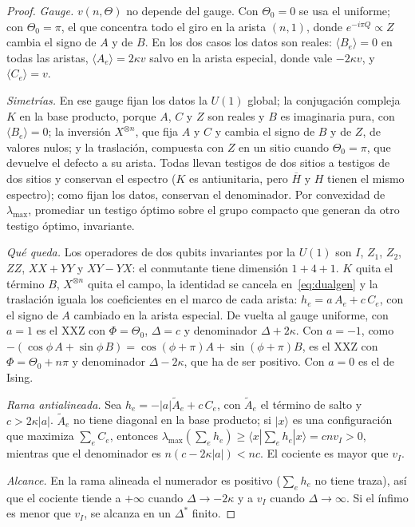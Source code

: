\documentclass[11pt,a4paper]{article}
\theoremstyle{remark}
\newcommand{\ket}[1]{|#1\rangle}
\newcommand{\bra}[1]{\langle #1|}
\newcommand{\ev}[1]{\langle #1\rangle}
\begin{document}
\begin{proof}
\emph{Gauge.} $v(n,\Theta)$ no depende del gauge. Con $\Theta_0=0$ se usa el uniforme; con
$\Theta_0=\pi$, el que concentra todo el giro en la arista $(n,1)$, donde $e^{-i\pi Q}\propto Z$
cambia el signo de $A$ y de $B$. En los dos casos los datos son reales: $\ev{B_e}=0$ en todas las
aristas, $\ev{A_e}=2\kappa v$ salvo en la arista especial, donde vale $-2\kappa v$, y
$\ev{C_e}=v$.

\emph{Simetrías.} En ese gauge fijan los datos la $U(1)$ global; la conjugación compleja $K$ en la
base producto, porque $A$, $C$ y $Z$ son reales y $B$ es imaginaria pura, con $\ev{B_e}=0$; la
inversión $X^{\otimes n}$, que fija $A$ y $C$ y cambia el signo de $B$ y de $Z$, de valores nulos;
y la traslación, compuesta con $Z$ en un sitio cuando $\Theta_0=\pi$, que devuelve el defecto a su
arista. Todas llevan testigos de dos sitios a testigos de dos sitios y conservan el espectro ($K$ es
antiunitaria, pero $\overline H$ y $H$ tienen el mismo espectro); como fijan los datos, conservan
el denominador. Por convexidad de $\lambda_{\max}$, promediar un testigo óptimo sobre el grupo
compacto que generan da otro testigo óptimo, invariante.

\emph{Qué queda.} Los operadores de dos qubits invariantes por la $U(1)$ son $I$, $Z_1$, $Z_2$,
$ZZ$, $XX+YY$ y $XY-YX$: el conmutante tiene dimensión $1+4+1$. $K$ quita el término $B$,
$X^{\otimes n}$ quita el campo, la identidad se cancela en~\eqref{eq:dualgen} y la traslación iguala
los coeficientes en el marco de cada arista: $h_e=a\,A_e+c\,C_e$, con el signo de $A$ cambiado en
la arista especial. De vuelta al gauge uniforme, con $a=1$ es el XXZ con $\Phi=\Theta_0$, $\Delta=c$
y denominador $\Delta+2\kappa$. Con $a=-1$, como $-(\cos\phi\,A+\sin\phi\,B)=\cos(\phi+\pi)A+
\sin(\phi+\pi)B$, es el XXZ con $\Phi=\Theta_0+n\pi$ y denominador $\Delta-2\kappa$, que ha de ser
positivo. Con $a=0$ es el de Ising.

\emph{Rama antialineada.} Sea $h_e=-|a|\tilde A_e+c\,C_e$, con $\tilde A_e$ el término de salto y
$c>2\kappa|a|$. $\tilde A_e$ no tiene diagonal en la base producto; si $\ket x$ es una configuración
que maximiza $\sum_eC_e$, entonces $\lambda_{\max}(\sum_eh_e)\ge\bra x\sum_eh_e\ket x=cnv_I>0$,
mientras que el denominador es $n(c-2\kappa|a|)<nc$. El cociente es mayor que $v_I$.

\emph{Alcance.} En la rama alineada el numerador es positivo ($\sum_eh_e$ no tiene traza), así que
el cociente tiende a $+\infty$ cuando $\Delta\to-2\kappa$ y a $v_I$ cuando $\Delta\to\infty$. Si el
ínfimo es menor que $v_I$, se alcanza en un $\Delta^\ast$ finito.
\end{proof}
\end{document}
